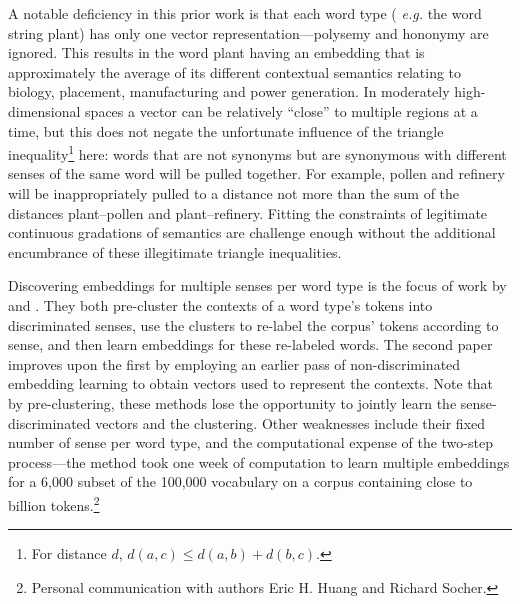 \documentclass[11pt,a4paper]{article}
\begin{document}
A notable deficiency in this prior work is that each word type ({\it
  e.g.} the word string {\sf\small plant}) has only one vector
representation---polysemy and hononymy are ignored.  This results in
the word {\sf\small plant} having an embedding that is approximately the
average of its different contextual semantics relating to biology,
placement, manufacturing and power generation.  In moderately
high-dimensional spaces a vector can be relatively ``close'' to
multiple regions at a time, but this does not negate the unfortunate
influence of the triangle inequality\footnote{For distance $d$, $d(a,c) \leq d(a,b) + d(b,c)$.} here: words that are
not synonyms but are synonymous with different senses of the same word
will be pulled together.  For example, {\sf\small pollen} and {\sf\small refinery}
will be inappropriately pulled to a distance not more than the sum of
the distances {\sf\small plant--pollen} and {\sf\small plant--refinery}.  Fitting
the constraints of legitimate continuous gradations of semantics are
challenge enough without the additional encumbrance of these
illegitimate triangle inequalities.




Discovering embeddings for multiple senses per word type is the focus
of work by  and .  They
both pre-cluster the contexts of a word type's tokens into
discriminated senses, use the clusters to re-label the corpus' tokens
according to sense, and then learn embeddings for these re-labeled
words.  The second paper improves upon the first by employing an
earlier pass of non-discriminated embedding learning to obtain vectors
used to represent the contexts.  Note that by pre-clustering, these
methods lose the opportunity to jointly learn the sense-discriminated
vectors and the clustering.  Other weaknesses include their fixed
number of sense per word type, and the computational expense of the
two-step process---the  method took one week of
computation to learn multiple embeddings for a 6,000 subset of the
100,000 vocabulary on a corpus containing close to billion tokens.\footnote{Personal
  communication with authors Eric H. Huang and Richard Socher.}
\end{document}
